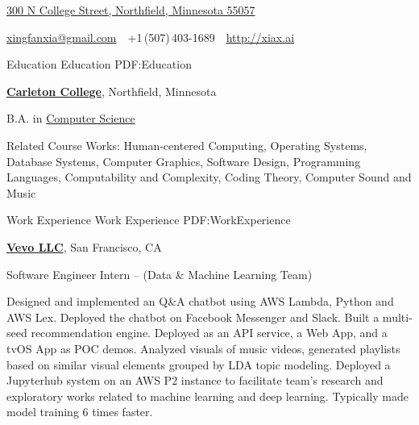 \documentclass[letterpaper,MMMyyyy,nonstopmode]{simpleresumecv}
\newcommand{\CVAuthor}{Xingfan Xia}
\newcommand{\CVWebpage}{http://xiax.ai}
\begin{document}

\Title{\CVAuthor}

\begin{SubTitle}
\href{https://www.google.com/maps/place/300+N+College+Street,+Northfield,+Minnesota+55057}
{300 N College Street, Northfield, Minnesota 55057}
\par
\href{mailto:xingfanxia@gmail.com}
{xingfanxia@gmail.com}
\,\SubBulletSymbol\,
+1\,(507)\,403-1689
\,\SubBulletSymbol\,
\href{\CVWebpage}
{\url{\CVWebpage}}
\end{SubTitle}

\begin{Body}


\Section
{Education}
{Education}
{PDF:Education}

\Entry
\href{https://www.carleton.edu/}
{\textbf{Carleton College}},
Northfield, Minnesota

\Gap
\BulletItem
B.A. in
\href{https://apps.carleton.edu/curricular/cs/}
{Computer Science}
\hfill
{}
\begin{Detail}
\SubBulletItem
Related Course Works: Human-centered Computing, Operating Systems, Database Systems, Computer Graphics, Software Design, Programming Languages, Computability and Complexity, Coding Theory, Computer Sound and Music

\end{Detail}


\Section
{Work\newline
Experience}
{Work Experience}
{PDF:WorkExperience}

\Entry
\href{http://hq.vevo.com/}
{\textbf{Vevo LLC}},
San Francisco, CA

\Gap
\BulletItem
Software Engineer Intern
\hfill
{} --
\newline
(Data \& Machine Learning Team)
\begin{Detail}
\SubBulletItem
Designed and implemented an Q\&A chatbot using AWS Lambda, Python and AWS Lex. Deployed the chatbot on Facebook Messenger and Slack.
\SubBulletItem
Built a multi-seed recommendation engine. Deployed as an API service, a Web App, and a tvOS App as POC demos.
\SubBulletItem
Analyzed visuals of music videos, generated playlists based on similar visual elements grouped by LDA topic modeling.
\SubBulletItem
Deployed a Jupyterhub system on an AWS P2 instance to facilitate team's research and exploratory works related to machine learning and deep learning. Typically made model training 6 times faster.
\end{Detail}


\end{Body}
\end{document}
